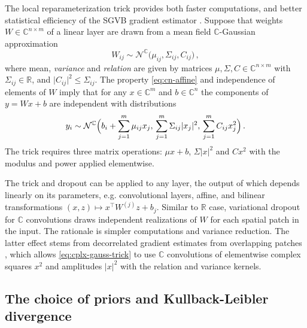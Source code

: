 \documentclass[a4paper,10pt]{article}
\newcommand{\real}{\mathbb{R}}
\newcommand{\cplx}{\mathbb{C}}
\begin{document}
The local reparameterization trick provides both faster computations, and better statistical
efficiency of the SGVB gradient estimator \citep{wang_fast_2013,kingma_variational_2015}.
Suppose that weights $W \in \cplx^{n\times m}$ of a linear layer are drawn from a mean
field $\cplx$-Gaussian approximation
\begin{equation}  \label{eq:c-gauss-vi-general}
  W_{ij}
    \sim \mathcal{N}^{\cplx} \bigl(
      \mu_{ij}, \Sigma_{ij}, C_{ij}
    \bigr)
  \,,
\end{equation}
where mean, \textit{variance} and \textit{relation} are given by matrices $
  \mu, \Sigma, C \in \cplx^{n\times m}
$ with $\Sigma_{ij} \in \real$, and $
  \lvert C_{ij} \rvert^2 \leq \Sigma_{ij}
$. The property \eqref{eq:cn-affine} and independence of elements of $W$ imply that for any
$x \in \cplx^m$ and $b \in \cplx^n$ the components of $y = W x + b$ are independent with
distributions
\begin{equation}  \label{eq:cplx-gauss-trick}
  y_i
    \sim \mathcal{N}^{\cplx}
      \Bigl(
        b_i + \sum_{j=1}^m \mu_{ij} x_j,
        \, \sum_{j=1}^m \Sigma_{ij} \lvert x_j \rvert^2,
        \, \sum_{j=1}^m C_{ij} x_j^2
      \Bigr)
    \,.
\end{equation}
The trick requires three matrix operations: $\mu x + b$, $\Sigma \lvert x \rvert^2$ and
$C x^2$ with the modulus and power applied elementwise.

The trick and dropout can be applied to any layer, the output of which depends linearly on
its parameters, e.g. convolutional layers, affine, and bilinear transformations $
  (x, z) \mapsto x^\top W^{(j)} z + b_j
$. Similar to $\real$ case, variational dropout for $\cplx$ convolutions draws independent
realizations of $W$ for each spatial patch in the input. The rationale is simpler computations
and variance reduction. The latter effect stems from decorrelated gradient estimates from
overlapping patches \citep{kingma_variational_2015}, which allows \eqref{eq:cplx-gauss-trick}
to use $\cplx$ convolutions of elementwise complex squares $x^2$ and amplitudes $\lvert x \rvert^2$
with the relation and variance kernels.


\subsection{The choice of priors and Kullback-Leibler divergence} %
\label{sub:priors_and_kullback_leibler_divergence}
\end{document}
